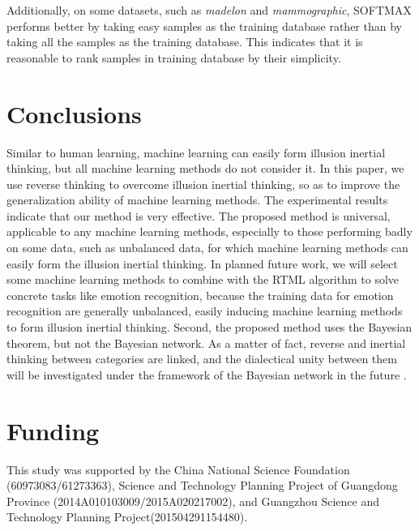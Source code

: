 Additionally, on some datasets, such as \emph{madelon} and \emph{mammographic}, SOFTMAX performs better by taking easy samples as the training database rather than by taking all the samples as the training database. This indicates that it is reasonable to rank samples in training database by their simplicity.

\section{Conclusions}
Similar to human learning, machine learning can easily form illusion inertial thinking, but all machine learning methods do not consider it. In this paper, we use reverse thinking to overcome illusion inertial thinking, so as to improve the generalization ability of machine learning methods. The experimental results indicate that our method is very effective. The proposed method is universal, applicable to any machine learning methods, especially to those performing badly on some data, such as unbalanced data, for which machine learning methods can easily form the illusion inertial thinking. In planned future work, we will select some machine learning methods to combine with the RTML algorithm to solve concrete tasks like emotion recognition, because the training data for emotion recognition are generally unbalanced, easily inducing machine learning methods to form illusion inertial thinking. Second, the proposed method uses the Bayesian theorem, but not the Bayesian network. As a matter of fact, reverse and inertial thinking between categories are linked, and the dialectical unity between them will be investigated under the framework of the Bayesian network in the future \cite{DeMotta2016}.



\section*{Funding}
This study was supported by the China National Science Foundation (60973083/61273363), Science and Technology Planning Project of Guangdong Province (2014A010103009/2015A020217002), and Guangzhou Science and Technology Planning Project(201504291154480).

